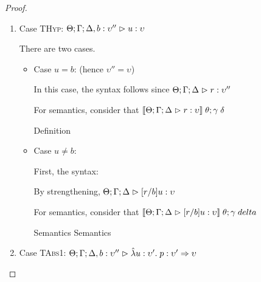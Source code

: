 \begin{proof}
\begin{enumerate}
\item Case \textsc{THyp}: $\judgeA[\Theta; \Gamma; \Delta, b:\upsilon'']{u}{\upsilon}$

  There are two cases. 
  \begin{itemize}
  \item Case $u = b$: (hence $\upsilon'' = \upsilon$)

    In this case, the syntax follows since $\judgeA{r}{\upsilon''}$

    For semantics, consider that $\interp{\judgeA[\Theta; \Gamma; \Delta]{r}{\upsilon}}\;\theta;\gamma\;\delta$
    \begin{eqnproof}
          {Definition}
    \end{eqnproof}

  \item Case $u \not= b$: 

  First, the syntax:
  \begin{tabbedproof}
  \oo By strengthening, $\judgeA[\Theta; \Gamma; \Delta]{[r/b]u}{\upsilon}$ \\
  \end{tabbedproof}

  For semantics, consider that $\interp{\judgeA[\Theta; \Gamma; \Delta]{[r/b]u}{\upsilon}}\;\theta;\gamma\;delta$ \\
  \begin{eqnproof}
          {Semantics} 
          {Semantics}
  \end{eqnproof}

  \end{itemize}




\item Case \textsc{TAbs1}: $\judgeA[\Theta; \Gamma; \Delta, b:\upsilon'']{\pfun{u}{\upsilon'}{p}}{\upsilon' \To \upsilon}$
  

\end{enumerate}
\end{proof}
